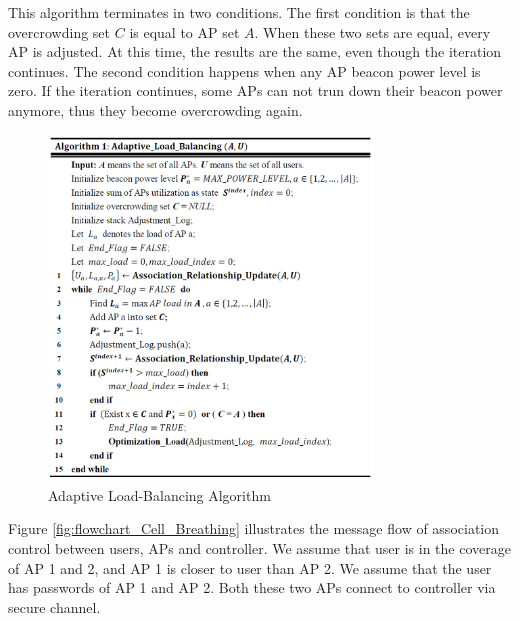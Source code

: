 This algorithm terminates in two conditions. The first condition is that the overcrowding set $C$ is equal to AP set $A$. When these two sets are equal, every AP is adjusted. At this time, the results are the same, even though the iteration continues. The second condition happens when any AP beacon power level is zero. If the iteration continues, some APs can not trun down their beacon power anymore, thus they become overcrowding again.

\begin{figure}[tbp]
\centering
\includegraphics[width=3.4in]{images/algorithm.png}
\caption{Adaptive Load-Balancing Algorithm}
\label{fig:algorithm}
\end{figure}

Figure \ref{fig:flowchart_Cell_Breathing} illustrates the message flow of association control between users, APs and controller. We assume that user is in the coverage of AP 1 and 2, and AP 1 is closer to user than AP 2. We assume that the user has passwords of AP 1 and AP 2. Both these two APs connect to controller via secure channel.

